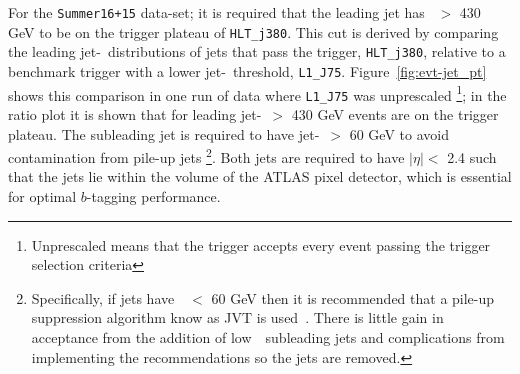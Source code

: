 For the \verb|Summer16+15| data-set; it is required that the leading jet has \pT~$>$ 430 GeV to be on the trigger plateau of \verb|HLT_j380|.
This cut is derived by comparing the leading jet-\pT~distributions of jets that pass the trigger, \verb|HLT_j380|,
relative to a benchmark trigger with a lower jet-\pT~threshold, \verb|L1_J75|.
Figure~\ref{fig:evt-jet_pt} shows this comparison in one run of data where \verb|L1_J75| was unprescaled
\footnote{Unprescaled means that the trigger accepts every event passing the trigger selection criteria};
in the ratio plot it is shown that for leading jet-\pT~$>$ 430 GeV events are on the trigger plateau.
The subleading jet is required to have jet-\pT~$>$ 60 GeV
to avoid contamination from pile-up jets
\footnote{Specifically, if jets have~\pT~$<$ 60 GeV then it is recommended that
  a pile-up suppression algorithm know as JVT is used~\cite{evt-jvt}.
  There is little gain in acceptance from the addition of low~\pT~subleading jets and
  complications from implementing the recommendations so the jets are removed. }.
Both jets  are required to have $|\eta| <$ 2.4
such that the jets lie within the volume of the ATLAS pixel detector,
which is essential for optimal $b$-tagging performance.

